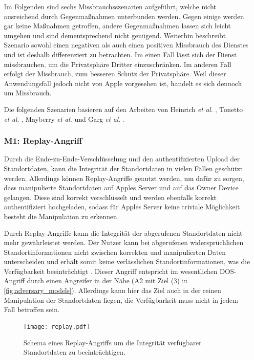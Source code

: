 Im Folgenden sind sechs Missbrauchsszenarien aufgeführt, welche nicht ausreichend durch Gegenmaßnahmen unterbunden werden.
Gegen einige werden gar keine Maßnahmen getroffen, andere Gegenmaßnahmen lassen sich leicht umgehen und sind dementsprechend nicht genügend.
Weiterhin beschreibt Szenario  sowohl einen negativen als auch einen positiven Missbrauch des Dienstes und ist deshalb differenziert zu betrachten.
Im einen Fall lässt sich der Dienst missbrauchen, um die Privatsphäre Dritter einzuschränken.
Im anderen Fall erfolgt der Missbrauch, zum besseren Schutz der Privatsphäre.
Weil dieser Anwendungsfall jedoch nicht von Apple vorgesehen ist, handelt es sich dennoch um Missbrauch.

Die folgenden Szenarien basieren auf den Arbeiten von Heinrich \textit{et al.} \cite{Heinrich_FindMy}, Tonetto \textit{et al.} \cite{Tonetto_FindMy}, Mayberry \textit{et al.} \cite{Mayberry_Tracking} und Garg \textit{et al.} \cite{Garg_Secure_Tracker}.

\subsubsection[M1]{M1: Replay-Angriff}
\label{missbrauch:1}
Durch die Ende-zu-Ende-Verschlüsselung und den authentifizierten Upload der Standortdaten, kann die Integrität der Standortdaten in vielen Fällen geschützt werden.
Allerdings können Replay-Angriffe genutzt werden, um dafür zu sorgen, dass manipulierte Standortdaten auf Apples Server und auf das Owner Device gelangen.
Diese sind korrekt verschlüsselt und werden ebenfalls korrekt authentifiziert hochgeladen, sodass für Apples Server keine triviale Möglichkeit besteht die Manipulation zu erkennen.

Durch Replay-Angriffe kann die Integrität der abgerufenen Standortdaten nicht mehr gewährleistet werden.
Der Nutzer kann bei abgerufenen widersprüchlichen Standortinformationen nicht zwischen korrekten und manipulierten Daten unterscheiden und erhält somit keine verlässlichen Standortinformationen, was die Verfügbarkeit beeinträchtigt \cite{Heinrich_FindMy}.
Dieser Angriff entspricht im wesentlichen \ac{DOS}-Angriff durch einen Angreifer in der Nähe (A2 mit Ziel (3) in \autoref{fig:adversary_models}).
Allerdings kann hier das Ziel auch in der reinen Manipulation der Standortdaten liegen, die Verfügbarkeit muss nicht in jedem Fall betroffen sein.
\begin{figure}[ht]
    \centering
    \texttt{[image: replay.pdf]}
    \caption{Schema eines Replay-Angriffs um die Integrität verfügbarer Standortdaten zu beeinträchtigen.}
    \label{fig:replay_attack}  
\end{figure}

